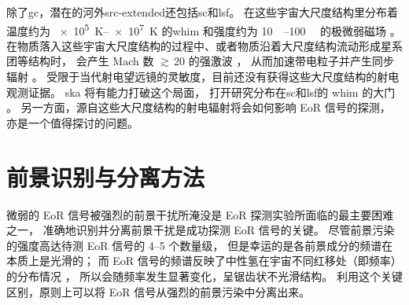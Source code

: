 除了\ac{gc}，潜在的河外\ac{src-extended}还包括\ac{sc}和\ac{lsf}。
在这些宇宙大尺度结构里分布着温度约为 \SIrange{e5}{e7}{\kelvin} 的\ac{whim}
和强度约为 \SIrange{10}{100}{\nano\gauss} 的极微弱磁场 \cite{vazza2014}。
在物质落入这些宇宙大尺度结构的过程中、或者物质沿着大尺度结构流动形成星系团等结构时，
会产生 Mach 数 $\gtrsim$\,20 的强激波 \cite{ryu2003,skillman2008}，
从而加速带电粒子并产生同步辐射 \cite{vazza2015}。
受限于当代射电望远镜的灵敏度，目前还没有获得这些大尺度结构的射电观测证据。
\ac{ska} 将有能力打破这个局面，
打开研究分布在\ac{sc}和\ac{lsf}的 \ac{whim} 的大门 \cite{vazza2015}。
另一方面，源自这些大尺度结构的射电辐射将会如何影响 EoR 信号的探测，
亦是一个值得探讨的问题。


\section{前景识别与分离方法}
\label{sec:fg-methods}

微弱的 EoR 信号被强烈的前景干扰所淹没是 EoR 探测实验所面临的最主要困难之一，
准确地识别并分离前景干扰是成功探测 EoR 信号的关键。
尽管前景污染的强度高达待测 EoR 信号的 \numrange{4}{5} 个数量级，
但是幸运的是各前景成分的频谱在本质上是光滑的；
而 EoR 信号的频谱反映了中性氢在宇宙不同红移处（即频率）的分布情况
\cite{diMatteo2002,oh2003,gnedin2004}，
所以会随频率发生显著变化，呈锯齿状不光滑结构。
利用这个关键区别，原则上可以将 EoR 信号从强烈的前景污染中分离出来。

